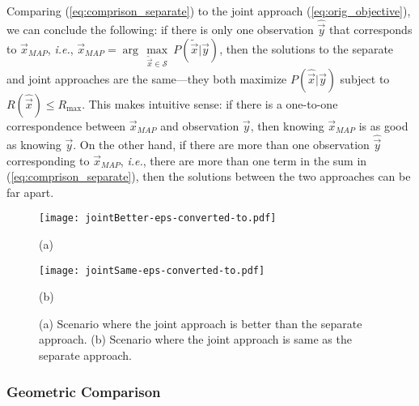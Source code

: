 Comparing (\ref{eq:comprison_separate}) to the joint approach (\ref{eq:orig_objective}), we can conclude the following: 
if there is only one observation $\hat{\vec{y}}$ that corresponds to $\vec{x}_{MAP}$, \textit{i.e.}, $\vec{x}_{MAP} = \arg\,\underset{\tilde{\vec{x}}\in  \mathcal{S}}{\max} \ P(\tilde{\vec{x}}|\hat{\vec{y}})$, then the solutions to the separate and joint approaches are the same---they both maximize $P(\hat{\vec{x}}|\vec{y})$ subject to $R(\hat{\vec{x}}) \leq R_{\max}$.
This makes intuitive sense: if there is a one-to-one correspondence between $\vec{x}_{MAP}$ and observation $\vec{y}$, then knowing $\vec{x}_{MAP}$ is as good as knowing $\vec{y}$.
On the other hand, if there are more than one observation $\hat{\vec{y}}$ corresponding to $\vec{x}_{MAP}$, \textit{i.e.}, there are  more than one term in the sum in (\ref{eq:comprison_separate}), then the solutions between the two approaches can be far apart.

\begin{figure}[t]

\begin{minipage}[b]{.48\linewidth}
  \centering
  \centerline{\texttt{[image: jointBetter-eps-converted-to.pdf]}}
  \centerline{(a)}\medskip
\end{minipage}
\hfill
\begin{minipage}[b]{0.48\linewidth}
  \centering
  \centerline{\texttt{[image: jointSame-eps-converted-to.pdf]}}
  \centerline{(b)}\medskip
\end{minipage}

\vspace{-0.3cm}
\caption{(a) Scenario where the joint approach is better than the separate approach.
(b) Scenario where the joint approach is same as the separate approach.}
\label{fig:joint_separate}
\end{figure}


\subsubsection{Geometric Comparison}

